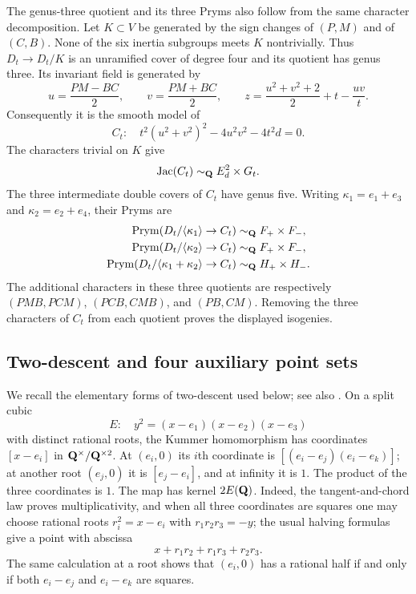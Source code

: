 The genus-three quotient and its three Pryms also follow from the same
character decomposition.  Let $K\subset V$ be generated by the sign
changes of $(P,M)$ and of $(C,B)$.  None of the six inertia subgroups
meets $K$ nontrivially.  Thus $D_t\to D_t/K$ is an unramified cover
of degree four and its quotient has genus three.  Its invariant field
is generated by
\[
 u=\frac{PM-BC}{2},\qquad v=\frac{PM+BC}{2},
 \qquad z=\frac{u^2+v^2+2}{2}+t-\frac{uv}{t}.
\]
Consequently it is the smooth model of
\begin{equation}\label{eq:nine-quartic}
 C_t:\quad t^2(u^2+v^2)^2-4u^2v^2-4t^2d=0.
\end{equation}
The characters trivial on $K$ give
\[
 \operatorname{Jac}(C_t)\sim_{\mathbf Q}E_d^2\times G_t.
\]
The three intermediate double covers of $C_t$ have genus five.
Writing $\kappa_1=e_1+e_3$ and $\kappa_2=e_2+e_4$, their Pryms are
\[
\begin{aligned}
 \operatorname{Prym}(D_t/\langle\kappa_1\rangle\to C_t)
   &\sim_{\mathbf Q}F_+\times F_-,\\
 \operatorname{Prym}(D_t/\langle\kappa_2\rangle\to C_t)
   &\sim_{\mathbf Q}F_+\times F_-,\\
 \operatorname{Prym}(D_t/\langle\kappa_1+\kappa_2\rangle\to C_t)
   &\sim_{\mathbf Q}H_+\times H_-.
\end{aligned}
\]
The additional characters in these three quotients are respectively
$(PMB,PCM)$, $(PCB,CMB)$, and $(PB,CM)$.  Removing the three
characters of $C_t$ from each quotient proves the displayed isogenies.

\subsection{Two-descent and four auxiliary point sets}

We recall the elementary forms of two-descent used below; see also
\cite{cassels1991,silverman2009}.  On a split cubic
\[
 E:\quad y^2=(x-e_1)(x-e_2)(x-e_3)
\]
with distinct rational roots, the Kummer homomorphism has coordinates
$[x-e_i]$ in $\mathbf Q^\times/\mathbf Q^{\times2}$.  At $(e_i,0)$ its $i$th
coordinate is $[(e_i-e_j)(e_i-e_k)]$; at another root $(e_j,0)$ it is
$[e_j-e_i]$, and at infinity it is $1$.  The product of the three
coordinates is $1$.  The map has kernel $2E(\mathbf Q)$.
Indeed, the tangent-and-chord law proves multiplicativity, and when
all three coordinates are squares one may choose rational roots
$r_i^2=x-e_i$ with $r_1r_2r_3=-y$; the usual halving formulas give a
point with abscissa
\[
 x+r_1r_2+r_1r_3+r_2r_3.
\]
The same calculation at a root shows that $(e_i,0)$ has a rational half
if and only if both $e_i-e_j$ and $e_i-e_k$ are squares.

